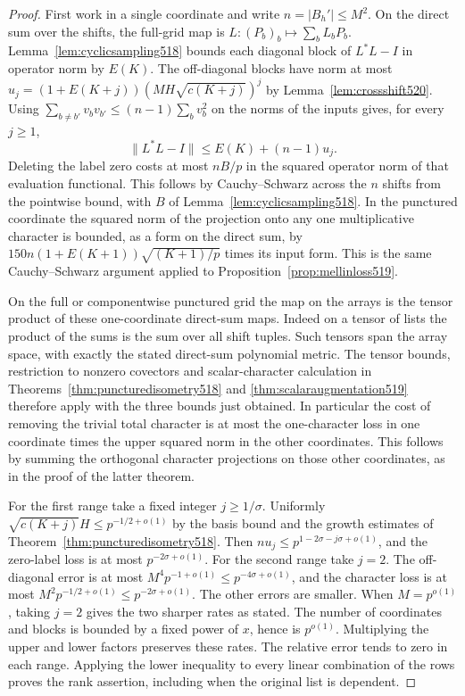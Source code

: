\documentclass[a4paper,11pt]{article}
\theoremstyle{definition}
\theoremstyle{remark}
\numberwithin{equation}{section}
\begin{document}
\begin{proof}
First work in a single coordinate and write \(n=|B_h'|\le M^2\).
On the direct sum over the shifts, the full-grid map is
\(L:(P_b)_b\mapsto\sum_b L_bP_b\). Lemma~\ref{lem:cyclicsampling518}
bounds each diagonal block of \(L^*L-I\) in operator norm by \(E(K)\).
The off-diagonal blocks have norm at most
\(u_j=(1+E(K+j))(MH\sqrt{c(K+j)})^j\) by
Lemma~\ref{lem:crossshift520}. Using
\(\sum_{b\ne b'}v_bv_{b'}\le(n-1)\sum_b v_b^2\) on the norms
of the inputs gives, for every \(j\ge1\),
\[
   \|L^*L-I\|\le E(K)+(n-1)u_j .
\]
Deleting the label zero costs at most \(nB/p\) in the squared
operator norm of that evaluation functional. This follows by
Cauchy--Schwarz across the \(n\) shifts from the pointwise
bound, with \(B\) of Lemma~\ref{lem:cyclicsampling518}. In the
punctured coordinate the squared norm of the projection onto
any one multiplicative character is bounded, as a form on the
direct sum, by \(150n(1+E(K+1))\sqrt{(K+1)/p}\) times its
input form. This is the same Cauchy--Schwarz argument applied
to Proposition~\ref{prop:mellinloss519}.

On the full or componentwise punctured grid the map on the arrays
is the tensor product of these one-coordinate direct-sum maps.
Indeed on a tensor of lists the product of the sums is the sum
over all shift tuples. Such tensors span the array space, with
exactly the stated direct-sum polynomial metric. The tensor bounds,
restriction to nonzero covectors and scalar-character calculation
in Theorems~\ref{thm:puncturedisometry518} and
\ref{thm:scalaraugmentation519} therefore apply with the three
bounds just obtained. In particular the cost of removing the
trivial total character is at most the one-character loss in one
coordinate times the upper squared norm in the other coordinates.
This follows by summing the orthogonal character projections on
those other coordinates, as in the proof of the latter theorem.

For the first range take a fixed integer \(j\ge 1/\sigma\).
Uniformly \(\sqrt{c(K+j)}H\le p^{-1/2+o(1)}\) by the basis bound
and the growth estimates of Theorem~\ref{thm:puncturedisometry518}.
Then \(nu_j\le p^{1-2\sigma-j\sigma+o(1)}\), and the zero-label
loss is at most \(p^{-2\sigma+o(1)}\). For the second range take
\(j=2\). The off-diagonal error is at most
\(M^4p^{-1+o(1)}\le p^{-4\sigma+o(1)}\), and the character loss
is at most \(M^2p^{-1/2+o(1)}\le p^{-2\sigma+o(1)}\). The other
errors are smaller. When \(M=p^{o(1)}\), taking \(j=2\) gives
the two sharper rates as stated. The number of coordinates and
blocks is bounded by a fixed power of \(x\), hence is \(p^{o(1)}\).
Multiplying the upper and lower factors preserves these rates.
The relative error tends to zero in each range. Applying the
lower inequality to every linear combination of the rows proves
the rank assertion, including when the original list is dependent.
\end{proof}
\end{document}
